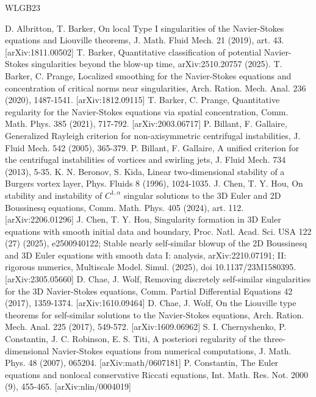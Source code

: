 \documentclass[11pt]{article}
\begin{document}
\begin{thebibliography}{WLGB23}

 D. Albritton, T. Barker, On local Type I singularities of the Navier-Stokes equations and Liouville theorems, J. Math. Fluid Mech. 21 (2019), art. 43. [arXiv:1811.00502]
 T. Barker, Quantitative classification of potential Navier-Stokes singularities beyond the blow-up time, arXiv:2510.20757 (2025).
 T. Barker, C. Prange, Localized smoothing for the Navier-Stokes equations and concentration of critical norms near singularities, Arch. Ration. Mech. Anal. 236 (2020), 1487-1541. [arXiv:1812.09115]
 T. Barker, C. Prange, Quantitative regularity for the Navier-Stokes equations via spatial concentration, Comm. Math. Phys. 385 (2021), 717-792. [arXiv:2003.06717]
 P. Billant, F. Gallaire, Generalized Rayleigh criterion for non-axisymmetric centrifugal instabilities, J. Fluid Mech. 542 (2005), 365-379.
 P. Billant, F. Gallaire, A unified criterion for the centrifugal instabilities of vortices and swirling jets, J. Fluid Mech. 734 (2013), 5-35.
 K. N. Beronov, S. Kida, Linear two-dimensional stability of a Burgers vortex layer, Phys. Fluids 8 (1996), 1024-1035.
 J. Chen, T. Y. Hou, On stability and instability of $C^{1,\alpha}$ singular solutions to the 3D Euler and 2D Boussinesq equations, Comm. Math. Phys. 405 (2024), art. 112. [arXiv:2206.01296]
 J. Chen, T. Y. Hou, Singularity formation in 3D Euler equations with smooth initial data and boundary, Proc. Natl. Acad. Sci. USA 122 (27) (2025), e2500940122; Stable nearly self-similar blowup of the 2D Boussinesq and 3D Euler equations with smooth data I: analysis, arXiv:2210.07191; II: rigorous numerics, Multiscale Model. Simul. (2025), doi 10.1137/23M1580395. [arXiv:2305.05660]
 D. Chae, J. Wolf, Removing discretely self-similar singularities for the 3D Navier-Stokes equations, Comm. Partial Differential Equations 42 (2017), 1359-1374. [arXiv:1610.09464]
 D. Chae, J. Wolf, On the Liouville type theorems for self-similar solutions to the Navier-Stokes equations, Arch. Ration. Mech. Anal. 225 (2017), 549-572. [arXiv:1609.06962]
 S. I. Chernyshenko, P. Constantin, J. C. Robinson, E. S. Titi, A posteriori regularity of the three-dimensional Navier-Stokes equations from numerical computations, J. Math. Phys. 48 (2007), 065204. [arXiv:math/0607181]
 P. Constantin, The Euler equations and nonlocal conservative Riccati equations, Int. Math. Res. Not. 2000 (9), 455-465. [arXiv:nlin/0004019]

\end{thebibliography}
\end{document}
